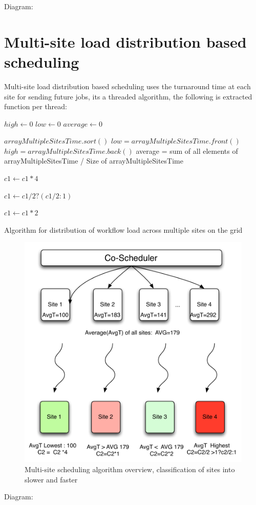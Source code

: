 \documentclass[ms,electronic,double]{nuthesis}
\begin{document}
Diagram:

\section{Multi-site load distribution based scheduling}
Multi-site load distribution based scheduling uses the turnaround time at each 
site for sending future jobs, its a threaded algorithm, the following is extracted function per thread:

\begin{algorithm}
\begin{algorithmic}

\STATE $high \gets 0$
\STATE $low \gets 0$
\STATE $average \gets 0$

\STATE $arrayMultipleSitesTime.sort()$
\STATE $low = arrayMultipleSitesTime.front()$
\STATE $high = arrayMultipleSitesTime.back()$
\STATE average = sum of all elements of arrayMultipleSitesTime / Size of arrayMultipleSitesTime

\STATE $c1 \gets c1 * 4$
\ENDIF

\STATE $c1 \gets c1/2 ? (c1/2:1)$
\ENDIF

\STATE $c1 \gets c1 * 2$
\ENDIF

\end{algorithmic}
\caption{Algorithm for distribution of workflow load across multiple sites on the grid}
\label{alg:updateJobPropagationConstant()}
\end{algorithm}


\begin{figure}[htbp!]
\begin{center}
\includegraphics[scale=0.75]{images/multipleSites}
\caption{Multi-site scheduling algorithm overview, classification of sites into slower and faster}
\label{fig:multiSite1}
\end{center}
\end{figure}
\FloatBarrier
Diagram:
\end{document}
